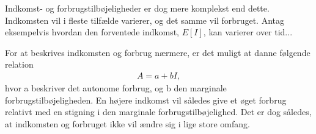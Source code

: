 Indkomst- og forbrugstilbøjeligheder er dog mere komplekst end dette. Indkomsten vil i fleste tilfælde varierer, og det samme vil forbruget. Antag eksempelvis hvordan den forventede indkomst, $E[I]$, kan varierer over tid...


For at beskrives indkomsten og forbrug nærmere, er det muligt at danne følgende relation
\begin{align*}
A = a+bI,
\end{align*}
hvor a beskriver det autonome forbrug, og b den marginale forbrugstilbøjeligheden. En højere indkomst vil således give et øget forbrug relativt med en stigning i den marginale forbrugstilbøjelighed. Det er dog således, at indkomsten og forbruget ikke vil ændre sig i lige store omfang. 

\fi